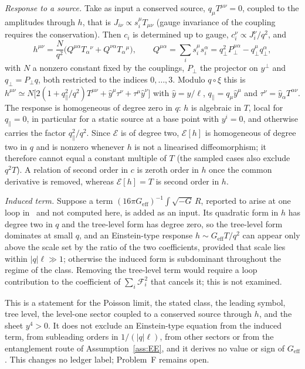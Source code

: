 \emph{Response to a source.} Take as input a conserved source, \(q_\mu T^{\mu\nu}=0\), coupled to the amplitudes through \(h\), that is \(J_{i\nu}\propto s_i^\mu T_{\mu\nu}\) (gauge invariance of the coupling requires the conservation). Then \(c_i\) is determined up to gauge, \(c_i^\nu\propto J_i^\nu/q^2\), and
\[
h^{\mu\nu}=\frac{N}{q^2}\bigl(Q^{\mu\alpha}T_\alpha{}^\nu+Q^{\nu\alpha}T_\alpha{}^\mu\bigr),\qquad
Q^{\mu\alpha}=\sum_is_i^\mu s_i^\alpha=q_\perp^2P_\perp^{\mu\alpha}-q_\perp^\mu q_\perp^\alpha ,
\]
with \(N\) a nonzero constant fixed by the couplings, \(P_\perp\) the projector on \(y^\perp\) and \(q_\perp=P_\perp q\), both restricted to the indices \(0,\dots,3\). Modulo \(q\circ\xi\) this is \(h^{\mu\nu}\simeq N\bigl[2(1+q_\parallel^2/q^2)T^{\mu\nu}+\hat y^\mu\tau^\nu+\tau^\mu\hat y^\nu\bigr]\) with \(\hat y=y/\ell\), \(q_\parallel=q_\mu\hat y^\mu\) and \(\tau^\nu=\hat y_\alpha T^{\alpha\nu}\). The response is homogeneous of degree zero in \(q\): \(h\) is algebraic in \(T\), local for \(q_\parallel=0\), in particular for a static source at a base point with \(y^i=0\), and otherwise carries the factor \(q_\parallel^2/q^2\). Since \(\mathcal E\) is of degree two, \(\mathcal E[h]\) is homogeneous of degree two in \(q\) and is nonzero whenever \(h\) is not a linearised diffeomorphism; it therefore cannot equal a constant multiple of \(T\) (the sampled cases also exclude \(q^2T\)). A relation of second order in \(c\) is zeroth order in \(h\) once the common derivative is removed, whereas \(\mathcal E[h]=T\) is second order in \(h\).

\emph{Induced term.} Suppose a term \((16\pi G_{\mathrm{eff}})^{-1}\int\sqrt{-G}\,R\), reported to arise at one loop in~\cite{Steinacker2023} and not computed here, is added as an input. Its quadratic form in \(h\) has degree two in \(q\) and the tree-level form has degree zero, so the tree-level form dominates at small \(q\), and an Einstein-type response \(h\sim G_{\mathrm{eff}}T/q^2\) can appear only above the scale set by the ratio of the two coefficients, provided that scale lies within \(|q|\ell\gg1\); otherwise the induced form is subdominant throughout the regime of the class. Removing the tree-level term would require a loop contribution to the coefficient of \(\sum_i\mathcal F_i^2\) that cancels it; this is not examined.

This is a statement for the Poisson limit, the stated class, the leading symbol, tree level, the level-one sector coupled to a conserved source through \(h\), and the sheet \(y^4>0\). It does not exclude an Einstein-type equation from the induced term, from subleading orders in \(1/(|q|\ell)\), from other sectors or from the entanglement route of Assumption~\ref{ass:EE}, and it derives no value or sign of \(G_{\mathrm{eff}}\). This changes no ledger label; Problem~F remains open.

